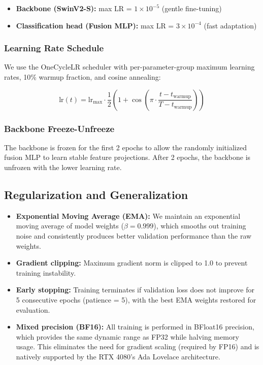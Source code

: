 \documentclass[12pt,a4paper]{report}
\begin{document}
\begin{itemize}
    \item \textbf{Backbone (SwinV2-S):} max LR = $1 \times 10^{-5}$ (gentle fine-tuning)
    \item \textbf{Classification head (Fusion MLP):} max LR = $3 \times 10^{-4}$ (fast adaptation)
\end{itemize}

\subsubsection{Learning Rate Schedule}

We use the OneCycleLR scheduler \cite{smith2019super} with per-parameter-group maximum learning rates, 10\% warmup fraction, and cosine annealing:

\begin{equation}
    \text{lr}(t) = \text{lr}_{\max} \cdot \frac{1}{2}\left(1 + \cos\left(\pi \cdot \frac{t - t_{\text{warmup}}}{T - t_{\text{warmup}}}\right)\right)
    \label{eq:onecycle}
\end{equation}

\subsubsection{Backbone Freeze-Unfreeze}

The backbone is frozen for the first 2 epochs to allow the randomly initialized fusion MLP to learn stable feature projections. After 2 epochs, the backbone is unfrozen with the lower learning rate.

\subsection{Regularization and Generalization}

\begin{itemize}
    \item \textbf{Exponential Moving Average (EMA):} We maintain an exponential moving average of model weights ($\beta = 0.999$), which smooths out training noise and consistently produces better validation performance than the raw weights.
    
    \item \textbf{Gradient clipping:} Maximum gradient norm is clipped to 1.0 to prevent training instability.
    
    \item \textbf{Early stopping:} Training terminates if validation loss does not improve for 5 consecutive epochs (patience = 5), with the best EMA weights restored for evaluation.
    
    \item \textbf{Mixed precision (BF16):} All training is performed in BFloat16 precision, which provides the same dynamic range as FP32 while halving memory usage. This eliminates the need for gradient scaling (required by FP16) and is natively supported by the RTX 4080's Ada Lovelace architecture.
\end{itemize}
\end{document}
